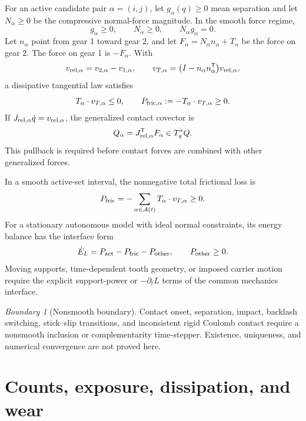 \documentclass[11pt,a4paper]{article}
\theoremstyle{definition}
\theoremstyle{plain}
\theoremstyle{remark}
\newtheorem{warning}[definition]{Boundary}
\newcommand{\Acal}{\mathcal A}
\begin{document}
For an active candidate pair \(\alpha=(i,j)\), let
\(g_\alpha(q)\ge0\) mean separation and let \(N_\alpha\ge0\) be the
compressive normal-force magnitude. In the smooth force regime,
\begin{equation}\label{eq:contact-complementarity}
g_\alpha\ge0,\qquad
N_\alpha\ge0,\qquad
N_\alpha g_\alpha=0.
\end{equation}
Let \(n_\alpha\) point from gear 1 toward gear 2, and let
\(F_\alpha=N_\alpha n_\alpha+T_\alpha\) be the force on gear 2. The
force on gear 1 is \(-F_\alpha\). With
\[
v_{{\rm rel},\alpha}=v_{2,\alpha}-v_{1,\alpha},\qquad
v_{T,\alpha}
=\bigl(I-n_\alpha n_\alpha^{\mathsf T}\bigr)v_{{\rm rel},\alpha},
\]
a dissipative tangential law satisfies
\begin{equation}\label{eq:friction-sign}
T_\alpha\cdot v_{T,\alpha}\le0,\qquad
P_{{\rm fric},\alpha}
:=-T_\alpha\cdot v_{T,\alpha}\ge0.
\end{equation}
If \(J_{{\rm rel},\alpha}\dot q=v_{{\rm rel},\alpha}\), the generalized
contact covector is
\begin{equation}\label{eq:force-pullback}
Q_\alpha=J_{{\rm rel},\alpha}^{\mathsf T}F_\alpha\in T_q^*Q.
\end{equation}
This pullback is required before contact forces are combined with
other generalized forces.

In a smooth active-set interval, the nonnegative total frictional loss
is
\begin{equation}\label{eq:friction-loss}
P_{\rm fric}
=-\sum_{\alpha\in\Acal(t)}
T_\alpha\cdot v_{T,\alpha}\ge0.
\end{equation}
For a stationary autonomous model with ideal normal constraints, its
energy balance has the interface form
\[
\dot E_L=P_{\rm act}-P_{\rm fric}-P_{\rm other},
\qquad P_{\rm other}\ge0.
\]
Moving supports, time-dependent tooth geometry, or imposed carrier
motion require the explicit support-power or
\(-\partial_tL\) terms of the common mechanics interface.

\begin{warning}[Nonsmooth boundary]
Contact onset, separation, impact, backlash switching, stick--slip
transitions, and inconsistent rigid Coulomb contact require a
nonsmooth inclusion or complementarity time-stepper. Existence,
uniqueness, and numerical convergence are not proved here.
\end{warning}

\section{Counts, exposure, dissipation, and wear}
\end{document}
